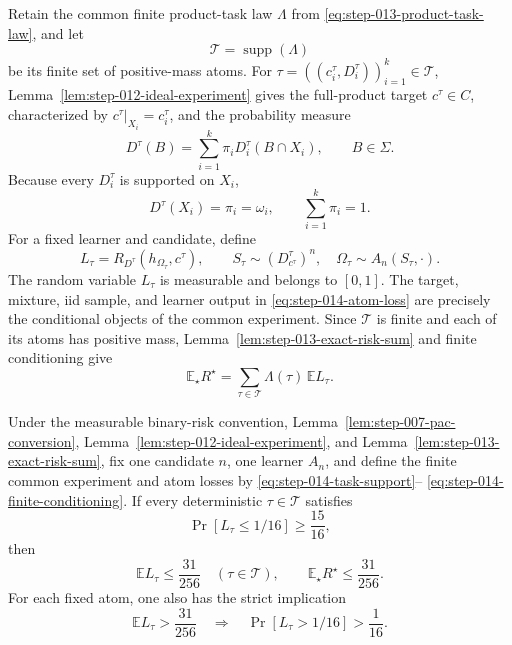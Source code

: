 Retain the common finite product-task law \(\Lambda\) from
\eqref{eq:step-013-product-task-law}, and let
\begin{equation}\label{eq:step-014-task-support}
\mathcal T=\operatorname{supp}(\Lambda)
\end{equation}
be its finite set of positive-mass atoms.  For
\(\tau=((c_i^\tau,D_i^\tau))_{i=1}^k\in\mathcal T\),
Lemma~\ref{lem:step-012-ideal-experiment} gives the full-product target
\(c^\tau\in C\), characterized by
\(c^\tau|_{X_i}=c_i^\tau\), and the probability measure
\begin{equation}\label{eq:step-014-atom-mixture}
D^\tau(B)=\sum_{i=1}^k
\pi_iD_i^\tau(B\cap X_i),
\qquad B\in\Sigma.
\end{equation}
Because every \(D_i^\tau\) is supported on \(X_i\),
\begin{equation}\label{eq:step-014-atom-masses}
D^\tau(X_i)=\pi_i=\omega_i,
\qquad
\sum_{i=1}^k\pi_i=1.
\end{equation}
For a fixed learner and candidate, define
\begin{equation}\label{eq:step-014-atom-loss}
L_\tau
=R_{D^\tau}(h_{\Omega_\tau},c^\tau),
\qquad
S_\tau\sim(D^\tau_{c^\tau})^n,
\quad
\Omega_\tau\sim A_n(S_\tau,\cdot).
\end{equation}
The random variable \(L_\tau\) is measurable and belongs to \([0,1]\).
The target, mixture, iid sample, and learner output in
\eqref{eq:step-014-atom-loss} are precisely the conditional objects of
the common experiment.  Since \(\mathcal T\) is finite and each of its
atoms has positive mass, Lemma~\ref{lem:step-013-exact-risk-sum} and
finite conditioning give
\begin{equation}\label{eq:step-014-finite-conditioning}
\mathbb E_\star R^\star
=\sum_{\tau\in\mathcal T}
\Lambda(\tau)\,\mathbb E L_\tau.
\end{equation}

\begin{lemma}
\label{lem:step-014-finite-prior-ceiling}
Under the measurable binary-risk convention,
Lemma~\ref{lem:step-007-pac-conversion},
Lemma~\ref{lem:step-012-ideal-experiment}, and
Lemma~\ref{lem:step-013-exact-risk-sum}, fix one candidate \(n\), one
learner \(A_n\), and define the finite common experiment and atom
losses by \eqref{eq:step-014-task-support}--%
\eqref{eq:step-014-finite-conditioning}.  If every deterministic
\(\tau\in\mathcal T\) satisfies
\begin{equation}\label{eq:step-014-atom-pac-premise}
\Pr[L_\tau\le1/16]\ge\frac{15}{16},
\end{equation}
then
\begin{equation}\label{eq:step-014-taskwise-ceiling}
\mathbb E L_\tau\le\frac{31}{256}
\quad(\tau\in\mathcal T),
\qquad
\mathbb E_\star R^\star\le\frac{31}{256}.
\end{equation}
For each fixed atom, one also has the strict implication
\begin{equation}\label{eq:step-014-strict-event-conversion}
\mathbb E L_\tau>\frac{31}{256}
\quad\Longrightarrow\quad
\Pr[L_\tau>1/16]>\frac1{16}.
\end{equation}
\end{lemma}

